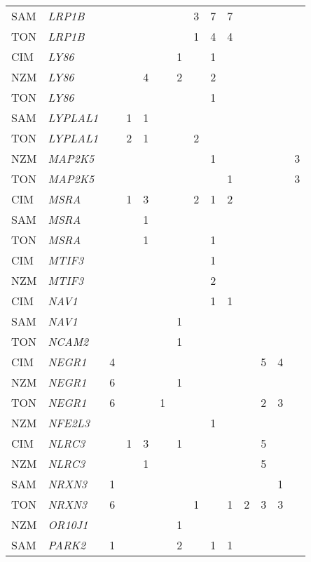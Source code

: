\documentclass[]{report}
\begin{document}
\begin{ThreePartTable}
\begin{longtable}[t]{llllllllllllll}
SAM & \em{LRP1B} &  &  &  &  &  & 3 & 7 & 7 &  &  &  & \\
TON & \em{LRP1B} &  &  &  &  &  & 1 & 4 & 4 &  &  &  & \\
CIM & \em{LY86} &  &  &  &  & 1 &  & 1 &  &  &  &  & \\
NZM & \em{LY86} &  &  & 4 &  & 2 &  & 2 &  &  &  &  & \\
TON & \em{LY86} &  &  &  &  &  &  & 1 &  &  &  &  & \\
SAM & \em{LYPLAL1} &  & 1 & 1 &  &  &  &  &  &  &  &  & \\
TON & \em{LYPLAL1} &  & 2 & 1 &  &  & 2 &  &  &  &  &  & \\
NZM & \em{MAP2K5} &  &  &  &  &  &  & 1 &  &  &  &  & 3\\
TON & \em{MAP2K5} &  &  &  &  &  &  &  & 1 &  &  &  & 3\\
CIM & \em{MSRA} &  & 1 & 3 &  &  & 2 & 1 & 2 &  &  &  & \\
SAM & \em{MSRA} &  &  & 1 &  &  &  &  &  &  &  &  & \\
TON & \em{MSRA} &  &  & 1 &  &  &  & 1 &  &  &  &  & \\
CIM & \em{MTIF3} &  &  &  &  &  &  & 1 &  &  &  &  & \\
NZM & \em{MTIF3} &  &  &  &  &  &  & 2 &  &  &  &  & \\
CIM & \em{NAV1} &  &  &  &  &  &  & 1 & 1 &  &  &  & \\
SAM & \em{NAV1} &  &  &  &  & 1 &  &  &  &  &  &  & \\
TON & \em{NCAM2} &  &  &  &  & 1 &  &  &  &  &  &  & \\
CIM & \em{NEGR1} & 4 &  &  &  &  &  &  &  &  & 5 & 4 & \\
NZM & \em{NEGR1} & 6 &  &  &  & 1 &  &  &  &  &  &  & \\
TON & \em{NEGR1} & 6 &  &  & 1 &  &  &  &  &  & 2 & 3 & \\
NZM & \em{NFE2L3} &  &  &  &  &  &  & 1 &  &  &  &  & \\
CIM & \em{NLRC3} &  & 1 & 3 &  & 1 &  &  &  &  & 5 &  & \\
NZM & \em{NLRC3} &  &  & 1 &  &  &  &  &  &  & 5 &  & \\
SAM & \em{NRXN3} & 1 &  &  &  &  &  &  &  &  &  & 1 & \\
TON & \em{NRXN3} & 6 &  &  &  &  & 1 &  & 1 & 2 & 3 & 3 & \\
NZM & \em{OR10J1} &  &  &  &  & 1 &  &  &  &  &  &  & \\
SAM & \em{PARK2} & 1 &  &  &  & 2 &  & 1 & 1 &  &  &  & \\

\end{longtable}
\end{ThreePartTable}
\end{document}

